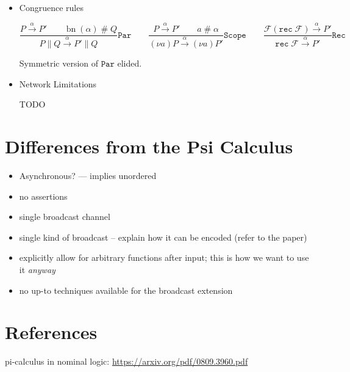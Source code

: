 \documentclass{article}
\newcommand{\new}[2]{(\nu\!#1) #2}
\newcommand{\freshFor}{\mathrel{\#}}
\newcommand{\rec}{\mathtt{rec}}
\DeclareMathOperator{\bn}{bn}
\begin{document}
\begin{itemize}
\item Congruence rules

\begin{equation*}
%
%
\frac{
P \xrightarrow{\alpha} P' \qquad
\bn(\alpha) \freshFor Q
}{
P \parallel Q \xrightarrow{\alpha} P' \parallel Q
}
\mathtt{Par}
%
\qquad
%
%
\frac{
P \xrightarrow{\alpha} P' \qquad
a \freshFor \alpha
}{
\new{a}{P} \xrightarrow{\alpha} \new{a}{P'}
}
\mathtt{Scope}
%
\qquad
%
%
\frac{
\mathcal{F}(\rec \; \mathcal{F}) \xrightarrow{\alpha} P'
}{
\rec \; \mathcal{F} \xrightarrow{\alpha} P'
}
\mathtt{Rec}
\end{equation*}

Symmetric version of $\mathtt{Par}$ elided.

\item{Network Limitations}

TODO

\end{itemize}

\section*{Differences from the Psi Calculus}

\begin{itemize}
\item Asynchronous? --- implies unordered
\item no assertions
\item single broadcast channel
\item single kind of broadcast -- explain how it can be encoded (refer to the paper)
\item explicitly allow for arbitrary functions after input; this is how we want to use it \emph{anyway}
\item no up-to techniques available for the broadcast extension
\end{itemize}

\section*{References}

pi-calculus in nominal logic: \url{https://arxiv.org/pdf/0809.3960.pdf}



\end{document}
